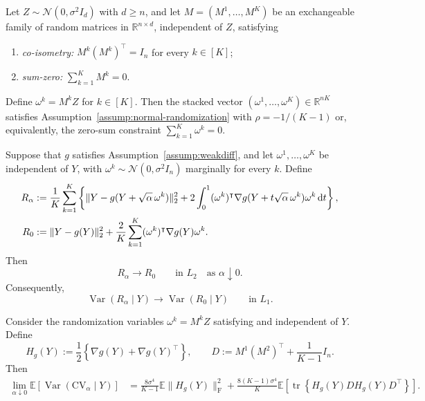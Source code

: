 \documentclass[10pt,a4paper]{amsart}
\def\R{\mathbb{R}}
\def\calN{\mathcal{N}}
\newcommand{\cv}{{\mathrm{CV}}}
\newcommand{\rd}{{\mathrm{d}}}
\newcommand{\tran}{^\intercal}
\begin{document}
\begin{proposition}
\label{lem: recipe:AR}
Let $Z\sim\calN(0,\sigma^2I_d)$ with $d\geq n$, and let $M=(M^1,\ldots,M^K)$ be an exchangeable family of random matrices in $\R^{n\times d}$, independent of $Z$, satisfying
\begin{enumerate}[label=(\roman*)]
    \item\label{cond:co-isometry} \emph{co-isometry:} $M^k(M^k)\tran=I_n$ for every $k\in[K]$;
    \item\label{cond:sum-zero-matrices} \emph{sum-zero:} $\displaystyle\sum_{k=1}^K M^k=0$.
\end{enumerate}
Define $\omega^k=M^kZ$ for $k\in[K]$.
Then the stacked vector $(\omega^1,\ldots,\omega^K)\in\R^{nK}$ satisfies Assumption~\ref{assump:normal-randomization} with $\rho=-1/(K-1)$ or, equivalently, the zero-sum constraint $\sum_{k=1}^K\omega^k=0$.
\end{proposition}

\begin{lemma}
\label{lem:smooth-small-noise-limit}
Suppose that $g$ satisfies Assumption~\ref{assump:weakdiff}, and let
$\omega^1,\ldots,\omega^K$ be independent of $Y$, with
$\omega^k\sim\calN(0,\sigma^2I_n)$ marginally for every $k$. Define
\begin{align}
R_\alpha
&:=
\frac1K\sum_{k=1}^K
\left\{
\|Y-g(Y+\sqrt\alpha\,\omega^k)\|_2^2
+
2\int_0^1
(\omega^k)\tran
\nabla g(Y+t\sqrt\alpha\,\omega^k)
\omega^k\,\rd t
\right\},\label{equ:def:R_alpha} \\ 
R_0
&:=
\|Y-g(Y)\|_2^2
+
\frac2K\sum_{k=1}^K
(\omega^k)\tran\nabla g(Y)\omega^k.\notag
\end{align}
Then
\[
R_\alpha\longrightarrow R_0
\qquad\text{in }L_2
\quad\text{as }\alpha\downarrow0.
\]
Consequently,
\[
\operatorname{Var}(R_\alpha\mid Y)
\longrightarrow
\operatorname{Var}(R_0\mid Y)
\qquad\text{in }L_1.
\]
\end{lemma}

\begin{lemma}
\label{lem:reducible:variance}
Consider the randomization variables $\omega^k=M^kZ$ satisfying
 and independent of $Y$. Define
\[
H_g(Y)
:=
\frac12\left\{
\nabla g(Y)+\nabla g(Y)\tran
\right\},\qquad
D
:=
M^1(M^2)\tran+\frac{1}{K-1}I_n.
\]
Then
\begin{align*}
\lim_{\alpha\downarrow0}
\mathbb E\left[
\operatorname{Var}(\cv_\alpha\mid Y)
\right]
&=
\frac{8\sigma^4}{K-1}
\mathbb E\|H_g(Y)\|_{\mathrm F}^2
+
\frac{8(K-1)\sigma^4}{K}
\mathbb E\left[
\operatorname{tr}
\left\{
H_g(Y)D H_g(Y)D\tran
\right\}
\right].
\end{align*}
\end{lemma}
\end{document}
